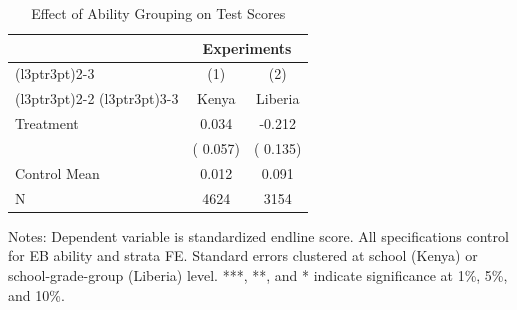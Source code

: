 \begin{table}[!h]
\centering
\caption{Effect of Ability Grouping on Test Scores}
\label{tab:itt}
\begin{threeparttable}
\begin{tabular}[t]{lcc}
\toprule
\multicolumn{1}{c}{ } & \multicolumn{2}{c}{Experiments} \\
\cmidrule(l{3pt}r{3pt}){2-3}
\multicolumn{1}{c}{ } & \multicolumn{1}{c}{(1)} & \multicolumn{1}{c}{(2)} \\
\cmidrule(l{3pt}r{3pt}){2-2} \cmidrule(l{3pt}r{3pt}){3-3}
 & \multicolumn{1}{c}{Kenya} & \multicolumn{1}{c}{Liberia} \\
\midrule
Treatment &   0.034 &  -0.212 \\
 & (  0.057) & (  0.135) \\
\addlinespace
Control Mean &   0.012 &   0.091 \\
N & 4624 & 3154 \\
\bottomrule
\end{tabular}
\begin{tablenotes}[para]
\item Notes: Dependent variable is standardized endline score. All specifications control for EB ability and strata FE. Standard errors clustered at school (Kenya) or school-grade-group (Liberia) level. ***, **, and * indicate significance at 1\%, 5\%, and 10\%.
\end{tablenotes}
\end{threeparttable}
\end{table}
